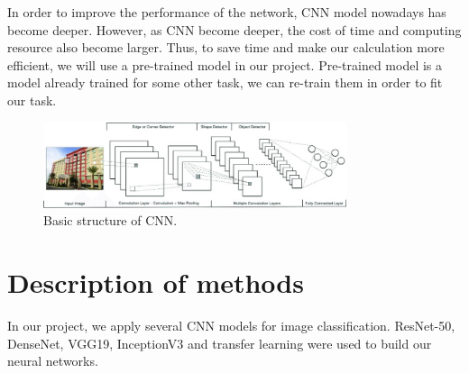 \documentclass{article}
\begin{document}
In order to improve the performance of the network, CNN model nowadays has become deeper. However, as CNN become deeper, the cost of time and computing resource also become larger. Thus, to save time and make our calculation more efficient, we will use a pre-trained model in our project. Pre-trained model is a model already trained for some other task, we can re-train them in order to fit our task.

\begin{figure}[H]
	\centering
	\includegraphics[width=3.5in]{pics/CNN} 
	\caption{Basic structure of CNN.}
\end{figure}

\section{Description of methods}

In our project, we apply several CNN models for image classification. ResNet-50, DenseNet, VGG19, InceptionV3 and transfer learning were used to build our neural networks.


\end{document}
